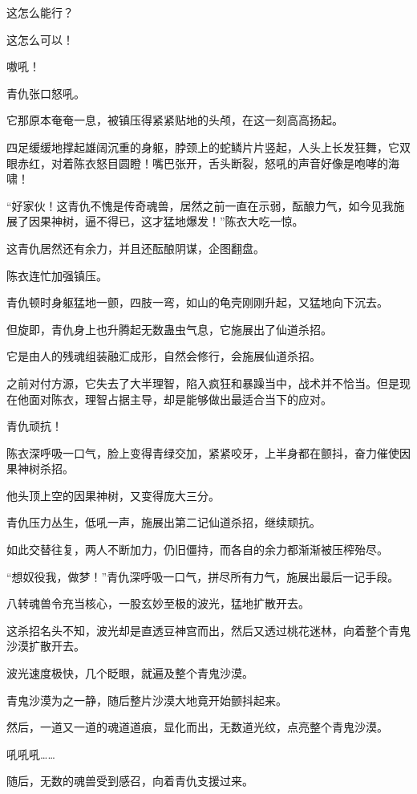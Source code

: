 \begin{this_body}
这怎么能行？

这怎么可以！

嗷吼！

青仇张口怒吼。

它那原本奄奄一息，被镇压得紧紧贴地的头颅，在这一刻高高扬起。

四足缓缓地撑起雄阔沉重的身躯，脖颈上的蛇鳞片片竖起，人头上长发狂舞，它双眼赤红，对着陈衣怒目圆瞪！嘴巴张开，舌头断裂，怒吼的声音好像是咆哮的海啸！

“好家伙！这青仇不愧是传奇魂兽，居然之前一直在示弱，酝酿力气，如今见我施展了因果神树，逼不得已，这才猛地爆发！”陈衣大吃一惊。

这青仇居然还有余力，并且还酝酿阴谋，企图翻盘。

陈衣连忙加强镇压。

青仇顿时身躯猛地一颤，四肢一弯，如山的龟壳刚刚升起，又猛地向下沉去。

但旋即，青仇身上也升腾起无数蛊虫气息，它施展出了仙道杀招。

它是由人的残魂组装融汇成形，自然会修行，会施展仙道杀招。

之前对付方源，它失去了大半理智，陷入疯狂和暴躁当中，战术并不恰当。但是现在他面对陈衣，理智占据主导，却是能够做出最适合当下的应对。

青仇顽抗！

陈衣深呼吸一口气，脸上变得青绿交加，紧紧咬牙，上半身都在颤抖，奋力催使因果神树杀招。

他头顶上空的因果神树，又变得庞大三分。

青仇压力丛生，低吼一声，施展出第二记仙道杀招，继续顽抗。

如此交替往复，两人不断加力，仍旧僵持，而各自的余力都渐渐被压榨殆尽。

“想奴役我，做梦！”青仇深呼吸一口气，拼尽所有力气，施展出最后一记手段。

八转魂兽令充当核心，一股玄妙至极的波光，猛地扩散开去。

这杀招名头不知，波光却是直透豆神宫而出，然后又透过桃花迷林，向着整个青鬼沙漠扩散开去。

波光速度极快，几个眨眼，就遍及整个青鬼沙漠。

青鬼沙漠为之一静，随后整片沙漠大地竟开始颤抖起来。

然后，一道又一道的魂道道痕，显化而出，无数道光纹，点亮整个青鬼沙漠。

吼吼吼……

随后，无数的魂兽受到感召，向着青仇支援过来。


\end{this_body}
